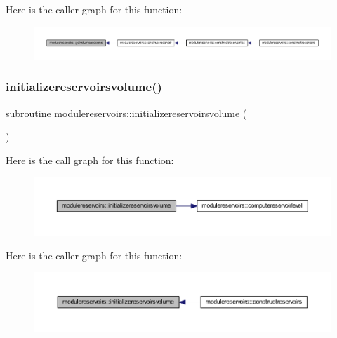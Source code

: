 Here is the caller graph for this function\+:\nopagebreak
\begin{figure}[H]
\begin{center}
\leavevmode
\includegraphics[width=350pt]{namespacemodulereservoirs_af78ebbee661caa48931d2c60385bda27_icgraph}
\end{center}
\end{figure}
\mbox{\label{namespacemodulereservoirs_a3194d2a617c1c30dfa86442b6dbe1c31}} 
\subsubsection{\texorpdfstring{initializereservoirsvolume()}{initializereservoirsvolume()}}
{\footnotesize\ttfamily subroutine modulereservoirs\+::initializereservoirsvolume (\begin{DoxyParamCaption}{ }\end{DoxyParamCaption})\hspace{0.3cm}{\ttfamily [private]}}

Here is the call graph for this function\+:\nopagebreak
\begin{figure}[H]
\begin{center}
\leavevmode
\includegraphics[width=350pt]{namespacemodulereservoirs_a3194d2a617c1c30dfa86442b6dbe1c31_cgraph}
\end{center}
\end{figure}
Here is the caller graph for this function\+:\nopagebreak
\begin{figure}[H]
\begin{center}
\leavevmode
\includegraphics[width=350pt]{namespacemodulereservoirs_a3194d2a617c1c30dfa86442b6dbe1c31_icgraph}
\end{center}
\end{figure}
\mbox{\label{namespacemodulereservoirs_a1e658ea45a1665c254648477f576c633}} 
